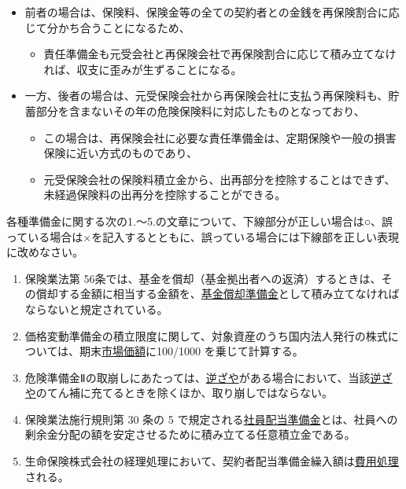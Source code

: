 \documentclass[report,gutter=10mm,fore-edge=10mm,uplatex,dvipdfmx]{jlreq}
\begin{document}
\begin{itemize}
\begin{itemize}
    \begin{itemize}
    \tightlist
    \item
      前者の場合は、保険料、保険金等の全ての契約者との金銭を再保険割合に応じて分かち合うことになるため、

      \begin{itemize}
      \tightlist
      \item
        責任準備金も元受会社と再保険会社で再保険割合に応じて積み立てなければ、収支に歪みが生ずることになる。
      \end{itemize}
    \item
      一方、後者の場合は、元受保険会社から再保険会社に支払う再保険料も、貯蓄部分を含まないその年の危険保険料に対応したものとなっており、

      \begin{itemize}
      \tightlist
      \item
        この場合は、再保険会社に必要な責任準備金は、定期保険や一般の損害保険に近い方式のものであり、
      \item
        元受保険会社の保険料積立金から、出再部分を控除することはできず、未経過保険料の出再分を控除することができる。
      \end{itemize}
    \end{itemize}
  \end{itemize}
\end{itemize}


各種準備金に関する次の1.～5.の文章について、下線部分が正しい場合は○、誤っている場合は×を記入するとともに、誤っている場合には下線部を正しい表現に改めなさい。

\begin{enumerate}
 \item  保険業法第 56条では、基金を償却（基金拠出者への返済）するときは、その償却する金額に相当する金額を、\underline{基金償却準備金}として積み立てなければならないと規定されている。

 \item 価格変動準備金の積立限度に関して、対象資産のうち国内法人発行の株式については、期末\underline{市場価額}に100/1000 を乗じて計算する。

 \item 
 危険準備金Ⅱの取崩しにあたっては、\underline{逆ざや}がある場合において、当該\underline{逆ざや}のてん補に充てるときを除くほか、取り崩しではならない。

\item  保険業法施行規則第 30 条の 5
 で規定される\underline{社員配当準備金}とは、社員への剰余金分配の額を安定させるために積み立てる任意積立金である。

\item 
 生命保険株式会社の経理処理において、契約者配当準備金繰入額は\underline{費用処理}される。
\end{enumerate}
\end{document}
